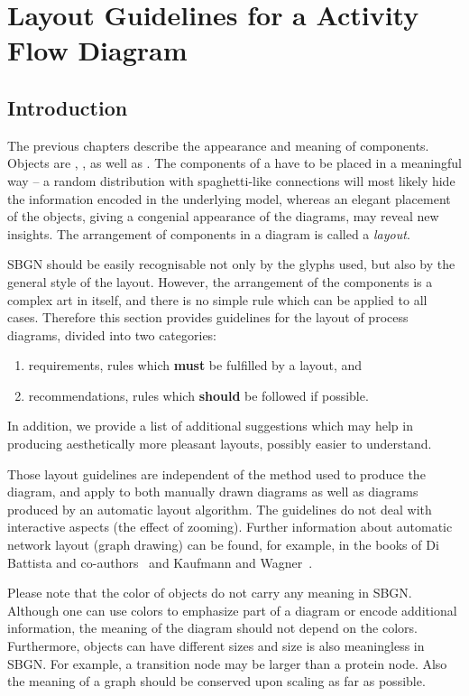 \chapter{Layout Guidelines for a Activity Flow Diagram}
\label{chp:af:layout}

\section{Introduction}

The previous chapters describe the appearance and meaning of
\SBGNAFLone components. Objects are , ,
 as well as .
The components of a \AF have to be placed in a meaningful way -- a random
distribution with spaghetti-like connections will most likely hide
the information encoded in the underlying model, whereas an elegant
placement of the objects, giving a congenial appearance of the
diagrams, may reveal new insights. The arrangement of components in a
diagram is called a \emph{layout}.

SBGN \AFs should be easily recognisable not only by the
glyphs used, but also by the general style of the layout. However, the
arrangement of the components is a complex art in itself, and there is
no simple rule which can be applied to all cases. Therefore this
section provides guidelines for the layout of process diagrams, divided
into two categories:
\begin{enumerate}
  \item requirements, \ie rules which \textbf{must} be fulfilled by a
  layout, and
  \item recommendations, \ie rules which \textbf{should} be followed if
  possible.
\end{enumerate}
In addition, we provide a list of additional suggestions which may help in
producing aesthetically more pleasant layouts, possibly easier to understand.

Those layout guidelines are independent of the method used to produce
the diagram, and apply to both manually drawn diagrams as well as
diagrams produced by an automatic layout algorithm. The guidelines do
not deal with interactive aspects (\eg the effect of zooming).
Further information about automatic network layout
(graph drawing) can be found, for example, in the books of Di Battista and
co-authors~\cite{DiBattista:1998} and Kaufmann and Wagner~\cite{Kaufmann:2001}.

Please note that the color of objects do not carry any meaning in
SBGN. Although one can use colors to emphasize part of a diagram or
encode additional information, the meaning of the diagram should not
depend on the colors. Furthermore, objects can have different sizes
and size is also meaningless in SBGN. For example, a transition node
may be larger than a protein node. Also the meaning of a graph
should be conserved upon scaling as far as possible.

